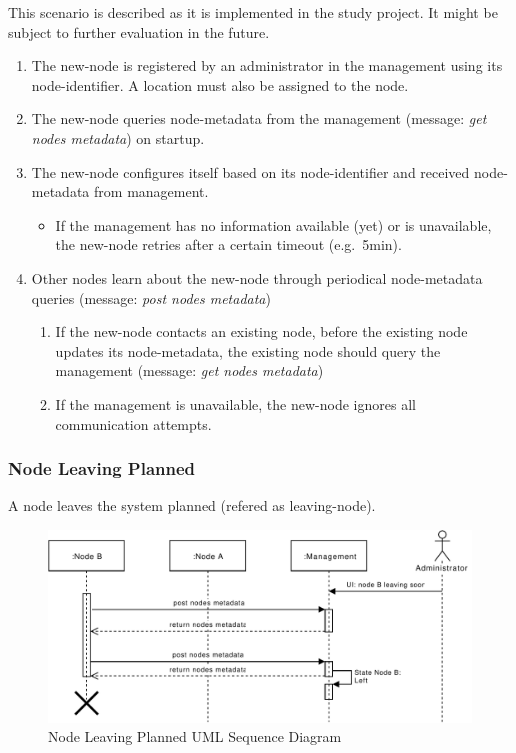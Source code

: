 This scenario is described as it is implemented in the study project. It might be subject to further evaluation in the future.

\begin{enumerate}
    \item The \gls{new-node} is registered by an \gls{administrator} in the \gls{management} using its \gls{node-identifier}. A \gls{location} must also be assigned to the \gls{node}. %
    \item The \gls{new-node} queries \gls{node-metadata} from the \gls{management} (message: \emph{get nodes metadata}) on startup.
    \item The \gls{new-node} configures itself based on its \gls{node-identifier} and received \gls{node-metadata} from \gls{management}.
        \begin{itemize}
            \item If the \gls{management} has no information available (yet) or is unavailable, the \gls{new-node} retries after a certain timeout (e.g.\ 5min).
        \end{itemize}
    \item Other \glspl{node} learn about the \gls{new-node} through periodical \gls{node-metadata} queries (message: \emph{post nodes metadata})
        \begin{enumerate}
            \item If the \gls{new-node} contacts an existing \gls{node}, before the existing \gls{node} updates its \gls{node-metadata}, the existing \gls{node} should query the \gls{management} (message: \emph{get nodes metadata})
            \item If the \gls{management} is unavailable, the \gls{new-node} ignores all communication attempts.
        \end{enumerate}
\end{enumerate}

\subsubsection{Node Leaving Planned}\label{sec:scenario-node-leave-planned}
A \gls{node} leaves the \gls{system} planned (refered as \gls{leaving-node}).

\begin{figure}[h]
    \centering
    \includegraphics[width=\linewidth]{resources/node_leaving_planned.pdf}
    \caption{Node Leaving Planned UML Sequence Diagram}
    \label{fig:node-leave-planned}
\end{figure}

